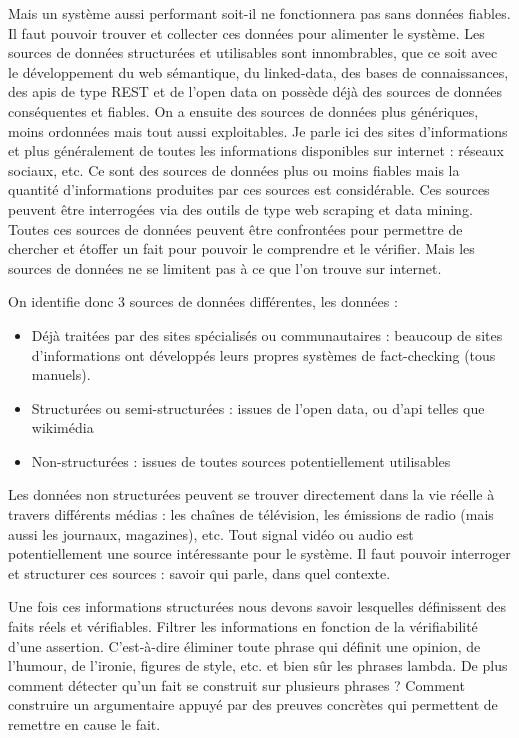 Mais un système aussi performant soit-il ne fonctionnera pas sans données fiables. Il faut pouvoir trouver et collecter ces données pour alimenter le système. Les sources de données structurées et utilisables sont innombrables, que ce soit avec le développement du web sémantique, du linked-data, des bases de connaissances, des apis de type REST et de l'open data on possède déjà des sources de données conséquentes et fiables. On a ensuite des sources de données plus génériques, moins ordonnées mais tout aussi exploitables. Je parle ici des sites d'informations et plus généralement de toutes les informations disponibles sur internet : réseaux sociaux, etc. Ce sont des sources de données plus ou moins fiables mais la quantité d'informations produites par ces sources est considérable. Ces sources peuvent être interrogées via des outils de type web scraping et data mining.
Toutes ces sources de données peuvent être confrontées pour permettre de chercher et étoffer un fait pour pouvoir le comprendre et le vérifier.
Mais les sources de données ne se limitent pas à ce que l'on trouve sur internet.

On identifie donc 3 sources de données différentes, les données : 

\begin{itemize}
    \item Déjà traitées par des sites spécialisés ou communautaires : beaucoup de sites d'informations ont développés leurs propres systèmes de fact-checking (tous manuels). 
    \item Structurées ou semi-structurées : issues de l'open data, ou d'api telles que wikimédia
    \item Non-structurées : issues de toutes sources potentiellement utilisables
\end{itemize}

Les données non structurées peuvent se trouver directement dans la vie réelle à travers différents médias : les chaînes de télévision, les émissions de radio (mais aussi les journaux, magazines), etc. Tout signal vidéo ou audio est potentiellement une source intéressante pour le système. Il faut pouvoir interroger et structurer ces sources : savoir qui parle, dans quel contexte.

Une fois ces informations structurées nous devons savoir lesquelles définissent des faits réels et vérifiables. Filtrer les informations en fonction de la vérifiabilité d'une assertion. C'est-à-dire éliminer toute phrase qui définit une opinion, de l'humour, de l'ironie, figures de style, etc. et bien sûr les phrases lambda. De plus comment détecter qu'un fait se construit sur plusieurs phrases ? Comment construire un argumentaire appuyé par des preuves concrètes qui permettent de remettre en cause le fait.

